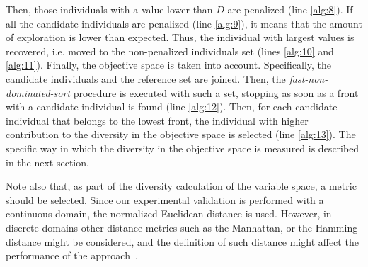 %
Then, those individuals with a \DCN{} value lower than $D$ are penalized (line \ref{alg:8}).
%
If all the candidate individuals are penalized (line \ref{alg:9}), it means that the amount of exploration is lower than expected.
%
Thus, the individual with largest \DCN{} values is recovered, i.e. moved to the non-penalized individuals set (lines \ref{alg:10} and \ref{alg:11}).
%
Finally, the objective space is taken into account.
%
Specifically, the candidate individuals and the reference set are joined.
%
Then, the \textit{fast-non-dominated-sort} procedure is executed with such a set, stopping as soon as a front with a candidate individual is found (line \ref{alg:12}).
%
Then, for each candidate individual that belongs to the lowest front, the individual with higher contribution to the diversity in the objective space is selected (line \ref{alg:13}).
%
The specific way in which the diversity in the objective space is measured is described in the next section.
%
%
%

Note also that, as part of the diversity calculation of the variable space, a metric should be selected.
%
Since our experimental validation is performed with a continuous domain, the normalized Euclidean distance is used.
%
However, in discrete domains other distance metrics such as the Manhattan, or the Hamming distance might be considered, and the definition of
such distance might affect the performance of the approach~\cite{Segura:17}.


%
%
%

%
%
%

